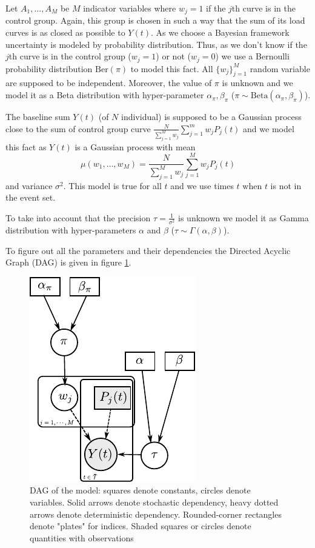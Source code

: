\documentclass[journal]{IEEEtran}
\begin{document}
Let $A_1,\ldots,A_M$ be $M$ indicator variables where $w_j=1$ if the
$j$th curve is in the control group. Again, this group is chosen in
such a way that the sum of its load curves is as closed as possible to
$Y(t)$. As we choose a Bayesian framework uncertainty is modeled by
probability distribution. Thus, as we don't know if the $j$th curve is
in the control group ($w_j=1$) or not ($w_j=0$) we use a Bernoulli
probability distribution $\mathrm{Ber}(\pi)$ to model this
fact. All $\{w_j\}_{j=1}^M$ random variable are supposed to be
independent.  Moreover, the value of $\pi$ is unknown and we model
it as a Beta distribution with hyper-parameter $\alpha_\pi,\beta_\pi$
($\pi\sim\mathrm{Beta}(\alpha_\pi,\beta_\pi)$).

The baseline sum $Y(t)$ (of $N$ individual) is supposed to be a
Gaussian process close to the sum of control group curve
$\frac{N}{\sum_{j=1}^{M}{w_j}}\sum_{j=1}^m w_j P_j(t)$ and we model
this fact as $Y(t)$ is a Gaussian process with mean
\begin{equation}
  \mu(w_1,\ldots,w_M) = \frac{N}{\sum_{j=1}^{M}{w_j}}\sum_{j=1}^M w_j P_j(t)
\end{equation}
and variance $\sigma^2$. This model is true for all $t$ and we use
times $t$ when $t$ is not in the event set.

To take into account that the precision $\tau=\frac{1}{\sigma^2}$ is
unknown we model it as Gamma distribution with hyper-parameters
$\alpha$ and $\beta$ ($\tau\sim\Gamma(\alpha,\beta)$).

To figure out all the parameters and their dependencies the Directed
Acyclic Graph (DAG) is given in figure \ref{dag}.
\begin{figure}[!h]
\centering
\includegraphics[]{dag}
\caption{DAG of the model: squares denote constants, circles denote
  variables. Solid arrows denote stochastic dependency, heavy dotted
  arrows denote deterministic dependency. Rounded-corner rectangles
  denote "plates" for indices. Shaded squares or circles denote
  quantities with observations}
\label{dag}
\end{figure}
\end{document}
